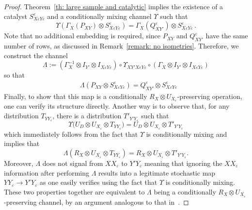 \documentclass[aps,pra,11pt,onecolumn,nofootinbib,tightenlines]{revtex4-2}
\theoremstyle{definition}
\begin{document}
\begin{proof}
Theorem~\ref{th: large sample and catalytic} implies the existence of a catalyst $S^\varepsilon_{X\varepsilon Y\varepsilon}$ and a conditionally mixing channel $\Upsilon$ such that
\begin{equation}
    \Upsilon(\Gamma_X (P_{XY}) \otimes S^\varepsilon_{X\varepsilon Y\varepsilon})= \Gamma_X (Q^\varepsilon_{XY'}) \otimes S^\varepsilon_{X\varepsilon Y\varepsilon} \,.
\end{equation}
Note that no additional embedding is required, since $P_{XY}$ and $Q^\varepsilon_{XY'}$ have the same number of rows, as discussed in Remark~\ref{remark: no isometries}.
Therefore, we construct the channel
\begin{equation}
	\Lambda := (\Gamma^{-1}_X \otimes I_{Y'}\otimes I_{X\varepsilon Y\varepsilon}) \circ \Upsilon_{XY'X\varepsilon Y\varepsilon} \circ (\Gamma_X \otimes I_{Y'}\otimes I_{X\varepsilon Y\varepsilon})
\end{equation}
so that
\begin{align}
	&\Lambda (P_{XY} \otimes S^\varepsilon_{X\varepsilon Y\varepsilon})  = Q^\varepsilon_{XY'} \otimes S^\varepsilon_{X\varepsilon Y\varepsilon}%
\end{align}
Finally, to show that this map is a conditionally $R_X\otimes U_{X_\varepsilon}$-preserving operation, one can verify its structure directly. Another way is to observe that, for any distribution $T_{YY_\varepsilon}$, there is a distribution $T'_{Y'Y_\varepsilon}$ such that
\begin{equation}
\Upsilon\big(U_D\otimes U_{X_\varepsilon}\otimes T_{YY_\varepsilon}\big)=U_D\otimes U_{X_\varepsilon}\otimes T'_{Y'Y_\varepsilon}
\end{equation}
which immediately follows from the fact that $\Upsilon$ is conditionally mixing and implies that
\begin{equation}
\Lambda(R_{X}\otimes U_{X_\varepsilon}\otimes T_{YY_\varepsilon})=R_X\otimes U_{X_\varepsilon
}\otimes T'_{Y'Y_\varepsilon}.
\end{equation}
Moreover, $\Lambda$ does not signal from $XX_\varepsilon$ to $Y'Y_\varepsilon$ meaning that ignoring the $XX_\varepsilon$ information after performing $\Lambda$ results into a legitimate stochastic map $YY_\varepsilon\to Y'Y_\varepsilon$ as one easily verifies using the fact that $\Upsilon$ is conditionally mixing. These two properties together are equivalent to $\Lambda$ being a conditionally $R_X\otimes U_{X_\varepsilon}$-preserving channel, by an argument analogous to that in~\cite[Section C]{gour2024inevitability}. 
\end{proof}
\end{document}
